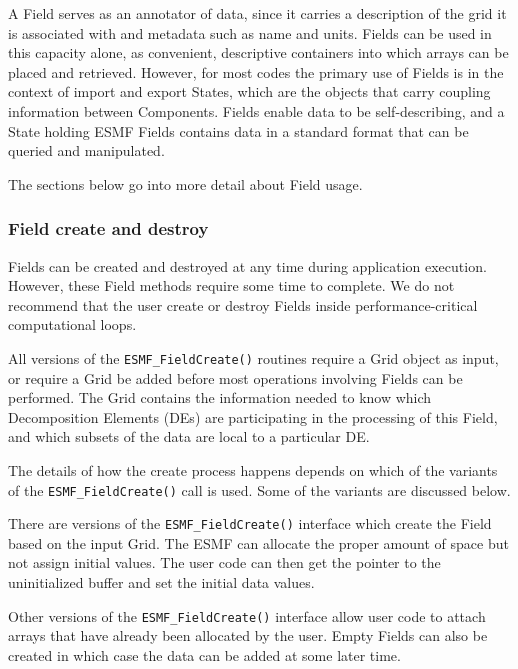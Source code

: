 

A Field serves as an annotator of data, since it carries 
a description of the grid it is associated with and metadata 
such as name and units.  Fields can be used in this capacity
alone, as convenient, descriptive containers into which arrays 
can be placed and retrieved.  However, for most codes the primary 
use of Fields is in the context of import and export States,
which are the objects that carry coupling information between 
Components.  Fields enable data to be self-describing, and a
State holding ESMF Fields contains data in a standard format
that can be queried and manipulated.  

The sections below go into more detail about Field usage.

\subsubsection{Field create and destroy}

Fields can be created and destroyed at any time during 
application execution.  However, these Field methods require 
some time to complete.  We do not recommend that the user
create or destroy Fields inside performance-critical 
computational loops.

All versions of the {\tt ESMF\_FieldCreate()} 
routines require a Grid object as input, or require a Grid
be added before most operations involving Fields can be performed.
The Grid contains the information needed to know which 
Decomposition Elements (DEs) are participating in 
the processing of this Field, and which subsets of the data
are local to a particular DE.

The details of how the create process happens depends 
on which of the variants of the {\tt ESMF\_FieldCreate()} 
call is used.  Some of the variants are discussed below.

There are versions of the {\tt ESMF\_FieldCreate()} interface
which create the Field based on the input Grid.  The ESMF
can allocate the proper amount of 
space but not assign initial values.  The user code
can then get the pointer to the uninitialized buffer and 
set the initial data values.

Other versions of the {\tt ESMF\_FieldCreate()} interface
allow user code to attach arrays that have already been
allocated by the user.  Empty Fields can also be created in
which case the data can be added at some later time.

